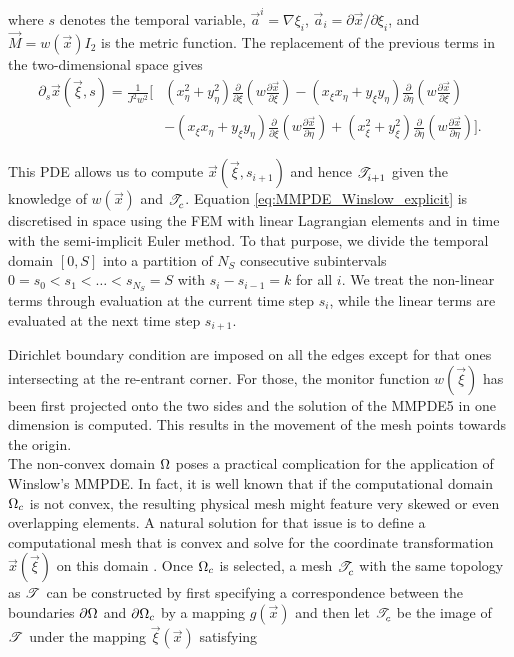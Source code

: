 \documentclass[a4paper,11pt]{article}
\begin{document}
where $s$ denotes the temporal variable, $\vec a^{i} = \nabla \xi_{i}$, $\vec a_{i} = \partial \vec{x}/\partial\xi_{i}$, and $\vec M = w(\vec{x})I_{2}$ is the metric function. The
replacement of the previous terms in the two-dimensional space gives
\begin{equation}
\begin{split}
  \partial_s \vec{x}(\vec{\xi},s)
  =
  \frac{1}{J^{2} w^{2}} \Bigg[& (x_{\eta}^{2} + y_{\eta}^{2})  \frac{\partial}{\partial \xi} \left(w \frac{\partial \vec{x}}{\partial \xi} \right) - (x_{\xi}x_{\eta} + y_{\xi}y_{\eta})\frac{\partial}{\partial \eta} \left( w \frac{\partial \vec{x}}{\partial \xi} \right)\\
      &-(x_{\xi}x_{\eta} + y_{\xi}y_{\eta})\frac{\partial}{\partial \xi} \left(w \frac{\partial \vec{x}}{\partial \eta} \right) + (x_{\xi}^{2} + y_{\xi}^{2})\frac{\partial}{\partial \eta}  \left( w\frac{\partial \vec{x}}{\partial \eta} \right) \Bigg].
\end{split}
\label{eq:MMPDE_Winslow_explicit}
\end{equation}

This PDE allows us to compute $\vec{x}(\vec{\xi},s_{i+1})$ and hence $\mathscr T^{}_{i+1}$ given the knowledge of $w(\vec{x})$ and $\mathscr T^{}_{c}$. Equation \eqref{eq:MMPDE_Winslow_explicit} is discretised in space using the FEM with linear Lagrangian elements and in time with the semi-implicit Euler method. To that purpose, we divide the temporal domain $[0,S]$ into a partition of $N_S$ consecutive subintervals $0=s_0 < s_1 < \dots < s_{N_S} = S$ with $s_i - s_{i-1} = k$ for all $i$. We treat the non-linear terms through evaluation at the current time step $s_i$, while the linear terms are evaluated at the next time step $s_{i+1}$.

Dirichlet boundary condition are imposed on all the edges except for that ones intersecting at the re-entrant corner. For those, the monitor function $w(\vec{\xi})$ has been first projected onto the two sides and the solution of the MMPDE5 \cite{HR:2011} in one dimension is computed. This results in the movement of the mesh points towards the origin.\\


The non-convex domain $\Omega$ poses a practical complication for the application of Winslow's MMPDE. In fact, it is well known that if the computational domain $\Omega_{c}$ is not convex, the resulting physical mesh might feature very skewed or even overlapping elements. A natural solution for that issue is to define a computational mesh that is convex and solve for the coordinate transformation $\vec{x}(\vec{\xi})$ on this domain \cite{CHR:1999,LTZ:2001}. Once $\Omega_c$ is selected, a mesh $\mathscr T^{}_{c}$ with the same topology as $\mathscr T^{}$ can be constructed by first specifying a correspondence between the boundaries $\partial \Omega$ and $\partial \Omega_{c}$ by a mapping $g(\vec{x})$ and then let  $\mathscr T^{}_{c}$ be the image of $\mathscr T^{}$ under the mapping $\vec{\xi}(\vec{x})$ satisfying
\end{document}
